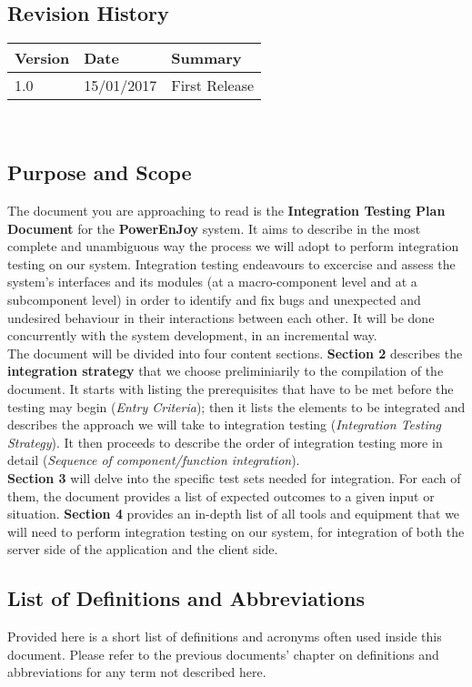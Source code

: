 \subsection{Revision History}
	\begin{tabular}{ |l|l|l| }
		\hline
		Version & Date & Summary\\ \hline
		1.0 & 15/01/2017 & First Release\\ \hline
	\end{tabular}
	\\

\subsection{Purpose and Scope}
	The document you are approaching to read is the \textbf{Integration Testing Plan Document} for the \textbf{PowerEnJoy} system. It aims to describe in the most complete and unambiguous way the process we will adopt to perform integration testing on our system. Integration testing endeavours to excercise and assess the system's interfaces and its modules (at a macro-component level and at a subcomponent level) in order to identify and fix bugs and unexpected and undesired behaviour in their interactions between each other. It will be done concurrently with the system development, in an incremental way.\\
	The document will be divided into four content sections. \textbf{Section 2} describes the \textbf{integration strategy} that we choose preliminiarily to the compilation of the document. It starts with listing the prerequisites that have to be met before the testing may begin (\textit{Entry Criteria}); then it lists the elements to be integrated and describes the approach we will take to integration testing (\textit{Integration Testing Strategy}). It then proceeds to describe the order of integration testing more in detail (\textit{Sequence of component/function integration}).\\
	\textbf{Section 3} will delve into the specific test sets needed for integration. For each of them, the document provides a list of expected outcomes to a given input or situation. \textbf{Section 4} provides an in-depth list of all tools and equipment that we will need to perform integration testing on our system, for integration of both the server side of the application and the client side. 

\subsection{List of Definitions and Abbreviations}
	Provided here is a short list of definitions and acronyms often used inside this document. Please refer to the previous documents' chapter on definitions and abbreviations for any term not described here.
